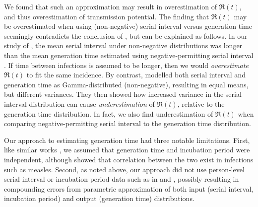 We found that such an approximation may result in
overestimation of $\Re(t)$,
and thus overestimation of \covid transmission potential.
The finding that $\Re(t)$ may be overestimated
when using (non-negative) serial interval versus generation time
seemingly contradicts the conclusion of \textcite{Britton2019},
but can be explained as follows.
In our study of \covid,
the mean serial interval under non-negative distributions \cite{Zhang2020,Nishiura2020}
was longer than the mean generation time
estimated using negative-permitting serial interval \cite{Du2020}.
If time between infections is assumed to be longer,
then we would \emph{overestimate} $\Re(t)$ to fit the same incidence.
By contrast, \textcite{Britton2019} modelled
both serial interval and generation time as Gamma-distributed (non-negative),
resulting in equal means, but different variances.
They then showed how increased variance in the serial interval distribution
can cause \emph{underestimation} of $\Re(t)$, relative to the generation time distribution. %
In fact, we also find underestimation of $\Re(t)$ when comparing
negative-permitting serial interval to the generation time distribution.
\par
Our approach to estimating generation time had three notable limitations.
First, like similar works \cite{Kuk2005,Ganyani2020}, we assumed that
generation time and incubation period were independent,
although \textcite{Klinkenberg2011} showed that
correlation between the two exist in infections such as measles.
Second, as noted above, our approach did not use
person-level serial interval or incubation period data
such as in \cite{Ganyani2020} and \cite{Klinkenberg2011},
possibly resulting in compounding errors from
parametric approximation of both input (serial interval, incubation period)
and output (generation time) distributions.

